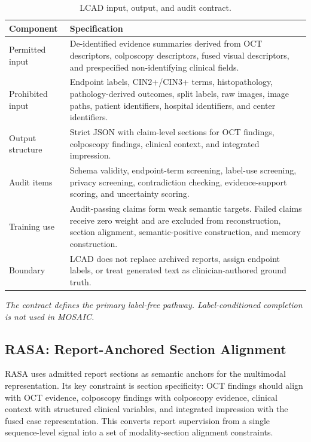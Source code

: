 \begin{table}[!t]
\centering
\caption{LCAD input, output, and audit contract.}
\label{tab:lcad_contract_final_topcs}
\footnotesize
\renewcommand{\arraystretch}{1.35}
\begin{threeparttable}
\begin{tabular}{p{3.4cm}p{9.6cm}}
\toprule
\rowcolor{gray!15}
\textbf{Component} & \textbf{Specification} \\
\midrule
Permitted input & De-identified evidence summaries derived from OCT descriptors, colposcopy descriptors, fused visual descriptors, and prespecified non-identifying clinical fields. \\
Prohibited input & Endpoint labels, CIN2+/CIN3+ terms, histopathology, pathology-derived outcomes, split labels, raw images, image paths, patient identifiers, hospital identifiers, and center identifiers. \\
Output structure & Strict JSON with claim-level sections for OCT findings, colposcopy findings, clinical context, and integrated impression. \\
Audit items & Schema validity, endpoint-term screening, label-use screening, privacy screening, contradiction checking, evidence-support scoring, and uncertainty scoring. \\
Training use & Audit-passing claims form weak semantic targets. Failed claims receive zero weight and are excluded from reconstruction, section alignment, semantic-positive construction, and memory construction. \\
Boundary & LCAD does not replace archived reports, assign endpoint labels, or treat generated text as clinician-authored ground truth. \\
\bottomrule
\end{tabular}
\begin{tablenotes}[flushleft]
\footnotesize
\item \textit{The contract defines the primary label-free pathway. Label-conditioned completion is not used in MOSAIC.}
\end{tablenotes}
\end{threeparttable}
\end{table}

\subsection{RASA: Report-Anchored Section Alignment}
\label{subsec:rasa_final_topcs}

RASA uses admitted report sections as semantic anchors for the multimodal representation. Its key constraint is section specificity: OCT findings should align with OCT evidence, colposcopy findings with colposcopy evidence, clinical context with structured clinical variables, and integrated impression with the fused case representation. This converts report supervision from a single sequence-level signal into a set of modality-section alignment constraints.

